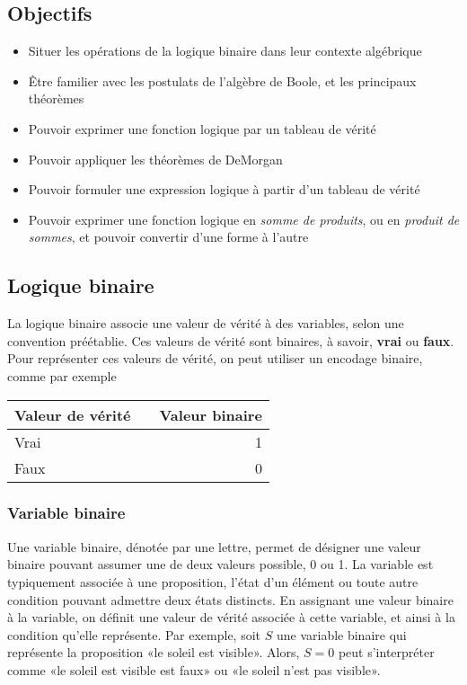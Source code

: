 \documentclass[11pt]{article}
\begin{document}
\subsection{Objectifs}
\label{sec:org934ed2e}
\begin{itemize}
\item Situer les opérations de la logique binaire dans leur contexte algébrique
\item Être familier avec les postulats de l'algèbre de Boole, et les
principaux théorèmes
\item Pouvoir exprimer une fonction logique par un tableau de vérité
\item Pouvoir appliquer les théorèmes de DeMorgan
\item Pouvoir formuler une expression logique à partir d'un tableau de vérité
\item Pouvoir exprimer une fonction logique en \emph{somme de produits}, ou en
\emph{produit de sommes}, et pouvoir convertir d'une forme à l'autre
\end{itemize}

\subsection{Logique binaire}
\label{sec:org8a66c2b}

La logique binaire associe une valeur de vérité à des variables, selon
une convention préétablie. Ces valeurs de vérité sont binaires, à
savoir, \textbf{vrai} ou \textbf{faux}. Pour représenter ces valeurs de vérité, on
peut utiliser un encodage binaire, comme par exemple

\begin{center}
\begin{tabular}{llr}
Valeur de vérité &  & Valeur binaire\\
\hline
Vrai &  & 1\\
Faux &  & 0\\
\end{tabular}
\end{center}


\subsubsection{Variable binaire}
\label{sec:orgc6faa0b}

Une variable binaire, dénotée par une lettre, permet de désigner une
valeur binaire pouvant assumer une de deux valeurs possible, 0
ou 1. La variable est typiquement associée à une proposition, l'état
d'un élément ou toute autre condition pouvant admettre deux états
distincts. En assignant une valeur binaire à la variable, on définit
une valeur de vérité associée à cette variable, et ainsi à la
condition qu'elle représente. Par exemple, soit \(S\) une variable
binaire qui représente la proposition «le soleil est visible». Alors,
\(S=0\) peut s'interpréter comme «le soleil est visible est faux» ou
«le soleil n'est pas visible».
\end{document}
